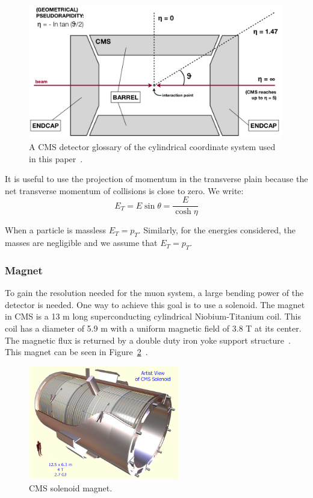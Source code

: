 \begin{figure}[htb]
\centering
\includegraphics[width=0.99\textwidth]{Experiment/DetectorGlossary.png}
\caption{A CMS detector glossary of the cylindrical coordinate system used in this paper~\cite{Pandolfi_talk}.}
\label{fig:CMS_detector_glossary}
\end{figure}

It is useful to use the projection of momentum in the transverse plain because the net transverse momentum of collisions is close to zero.  We write:
\begin{equation} E_T = E \sin \theta = \dfrac{E}{\cosh\eta} \label{eq:transverse_energy}\end{equation}

When a particle is massless $E_T=p_T$.  Similarly, for the energies considered, the masses are negligible and we assume that $E_T=p_T$.

\subsubsection{Magnet}

To gain the resolution needed for the muon system, a large bending power of the detector is needed.  One way to achieve this goal is to use a solenoid.  The magnet in CMS is a 13 m long superconducting cylindrical Niobium-Titanium coil.  This coil has a diameter of 5.9 m with a uniform magnetic field of 3.8 T at its center.  The magnetic flux is returned by a double duty iron yoke support structure~\cite{Magnet_CMS}. This magnet can be seen in Figure~\ref{fig:CMS_solenoid_magnet}~\cite{cms_solenoid_magnet}.

\begin{figure}[htb]
\centering
\includegraphics[width=0.59\textwidth]{Experiment/CMS-solenoid-magnet.jpg}
\caption{CMS solenoid magnet.~\cite{cms_solenoid_magnet}}
\label{fig:CMS_solenoid_magnet}
\end{figure}


